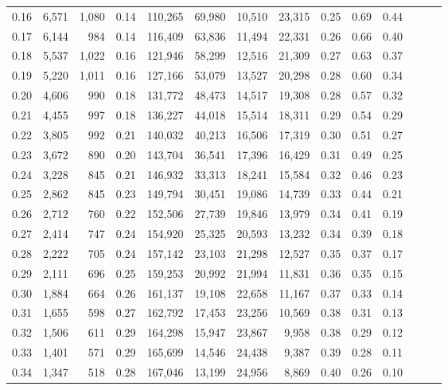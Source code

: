 \begin{tabular}{rrrrrrrrrrrrrr}
0.16 &  6,571 &  1,080 &  0.14 &  110,265 &   69,980 &  10,510 &  23,315 &  0.25 &  0.69 &      0.44 \\
0.17 &  6,144 &    984 &  0.14 &  116,409 &   63,836 &  11,494 &  22,331 &  0.26 &  0.66 &      0.40 \\
0.18 &  5,537 &  1,022 &  0.16 &  121,946 &   58,299 &  12,516 &  21,309 &  0.27 &  0.63 &      0.37 \\
0.19 &  5,220 &  1,011 &  0.16 &  127,166 &   53,079 &  13,527 &  20,298 &  0.28 &  0.60 &      0.34 \\
0.20 &  4,606 &    990 &  0.18 &  131,772 &   48,473 &  14,517 &  19,308 &  0.28 &  0.57 &      0.32 \\
0.21 &  4,455 &    997 &  0.18 &  136,227 &   44,018 &  15,514 &  18,311 &  0.29 &  0.54 &      0.29 \\
0.22 &  3,805 &    992 &  0.21 &  140,032 &   40,213 &  16,506 &  17,319 &  0.30 &  0.51 &      0.27 \\
0.23 &  3,672 &    890 &  0.20 &  143,704 &   36,541 &  17,396 &  16,429 &  0.31 &  0.49 &      0.25 \\
0.24 &  3,228 &    845 &  0.21 &  146,932 &   33,313 &  18,241 &  15,584 &  0.32 &  0.46 &      0.23 \\
0.25 &  2,862 &    845 &  0.23 &  149,794 &   30,451 &  19,086 &  14,739 &  0.33 &  0.44 &      0.21 \\
0.26 &  2,712 &    760 &  0.22 &  152,506 &   27,739 &  19,846 &  13,979 &  0.34 &  0.41 &      0.19 \\
0.27 &  2,414 &    747 &  0.24 &  154,920 &   25,325 &  20,593 &  13,232 &  0.34 &  0.39 &      0.18 \\
0.28 &  2,222 &    705 &  0.24 &  157,142 &   23,103 &  21,298 &  12,527 &  0.35 &  0.37 &      0.17 \\
0.29 &  2,111 &    696 &  0.25 &  159,253 &   20,992 &  21,994 &  11,831 &  0.36 &  0.35 &      0.15 \\
0.30 &  1,884 &    664 &  0.26 &  161,137 &   19,108 &  22,658 &  11,167 &  0.37 &  0.33 &      0.14 \\
0.31 &  1,655 &    598 &  0.27 &  162,792 &   17,453 &  23,256 &  10,569 &  0.38 &  0.31 &      0.13 \\
0.32 &  1,506 &    611 &  0.29 &  164,298 &   15,947 &  23,867 &   9,958 &  0.38 &  0.29 &      0.12 \\
0.33 &  1,401 &    571 &  0.29 &  165,699 &   14,546 &  24,438 &   9,387 &  0.39 &  0.28 &      0.11 \\
0.34 &  1,347 &    518 &  0.28 &  167,046 &   13,199 &  24,956 &   8,869 &  0.40 &  0.26 &      0.10 \\

\end{tabular}
